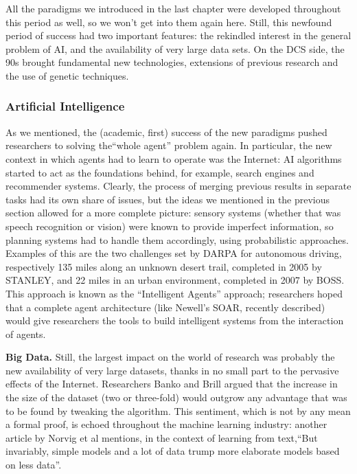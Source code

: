 \documentclass[../main.tex]{subfiles}
\begin{document}
All the paradigms we introduced in the last chapter were developed throughout this period as well, so we won't get into them again here. Still, this newfound period of success had two important features: the rekindled interest in the general problem of AI, and the availability of very large data sets. On the DCS side, the 90s brought fundamental new technologies, extensions of previous research and the use of genetic techniques.

\subsubsection{Artificial Intelligence}
As we mentioned, the (academic, first) success of the new paradigms pushed researchers to solving the``whole agent'' problem again. In particular, the new context in which agents had to learn to operate was the Internet: AI algorithms started to act as the foundations behind, for example, search engines and recommender systems. Clearly, the process of merging previous results in separate tasks had its own share of issues, but the ideas we mentioned in the previous section allowed for a more complete picture: sensory systems (whether that was speech recognition or vision) were known to provide imperfect information, so planning systems had to handle them accordingly, using probabilistic approaches. Examples of this are the two challenges set by DARPA for autonomous driving, respectively 135 miles along an unknown desert trail, completed in 2005 by STANLEY, and 22 miles in an urban environment, completed in 2007 by BOSS. This approach is known as the ``Intelligent Agents'' approach; researchers hoped that a complete agent architecture (like Newell's SOAR, recently described\cite{pressSoarCognitiveArchitecture2012}) would give researchers the tools to build intelligent systems from the interaction of agents.

\vspace{4pt}
\textbf{Big Data.} Still, the largest impact on the world of research was probably the new availability of very large datasets, thanks in no small part to the pervasive effects of the Internet. Researchers Banko and Brill\cite{bankoScalingVeryVery2001} argued that the increase in the size of the dataset (two or three-fold) would outgrow any advantage that was to be found by tweaking the algorithm. This sentiment, which is not by any mean a formal proof, is echoed throughout the machine learning industry: another article by Norvig et al mentions, in the context of learning from text,\enquote{But invariably, simple models and a lot of data trump more elaborate models based on less data}\cite{halevyUnreasonableEffectivenessData2009}.
\end{document}
